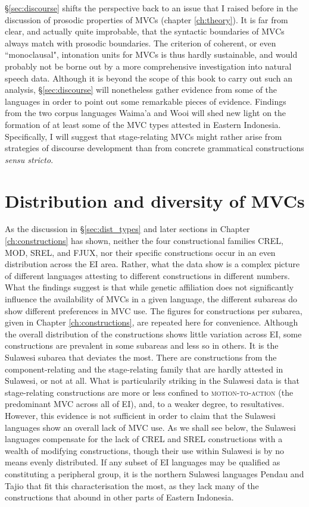 §\ref{sec:discourse} shifts the perspective back to an issue that I raised before in the discussion of prosodic properties of MVCs (chapter \ref{ch:theory}). It is far from clear, and actually quite improbable, that the syntactic boundaries of MVCs always match with prosodic boundaries. The criterion of coherent, or even ``monoclausal", intonation units for MVCs is thus hardly sustainable, and would probably not be borne out by a more comprehensive investigation into natural speech data. Although it is beyond the scope of this book to carry out such an analysis, §\ref{sec:discourse} will nonetheless gather evidence from some of the languages in order to point out some remarkable pieces of evidence. Findings from the two corpus languages Waima'a and Wooi will shed new light on the formation of at least some of the MVC types attested in Eastern Indonesia. Specifically, I will suggest that stage-relating MVCs might rather arise from strategies of discourse development than from concrete grammatical constructions \textit{sensu stricto}.

\section{Distribution and diversity of MVCs} \label{sec:distribution}

As the discussion in §\ref{sec:dist_types} and later sections in Chapter \ref{ch:constructions} has shown, neither the four constructional families CREL, MOD, SREL, and FJUX, nor their specific constructions occur in an even distribution across the EI area. Rather, what the data show is a complex picture of different languages attesting to different constructions in different numbers. What the findings suggest is that while genetic affiliation does not significantly influence the availability of MVCs in a given language, the different subareas do show different preferences in MVC use. The figures for constructions per subarea, given in Chapter \ref{ch:constructions}, are repeated here for convenience. Although the overall distribution of the constructions shows little variation across EI, some constructions are prevalent in some subareas and less so in others. It is the Sulawesi subarea that deviates the most. There are constructions from the component-relating and the stage-relating family that are hardly attested in Sulawesi, or not at all. What is particularily striking in the Sulawesi data is that stage-relating constructions are more or less confined to \textsc{motion-to-action} (the predominant MVC across all of EI), and, to a weaker degree, to resultatives. However, this evidence is not sufficient in order to claim that the Sulawesi languages show an overall lack of MVC use. As we shall see below, the Sulawesi languages compensate for the lack of CREL and SREL constructions with a wealth of modifying constructions, though their use within Sulawesi is by no means evenly distributed. If any subset of EI languages may be qualified as constituting a peripheral group, it is the northern Sulawesi languages Pendau and Tajio that fit this characterisation the most, as they lack many of the constructions that abound in other parts of Eastern Indonesia.


